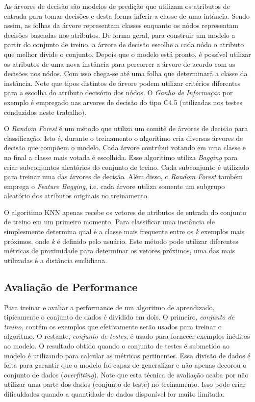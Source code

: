 As árvores de decisão são modelos de predição que utilizam os atributos de entrada para tomar decisões e desta forma inferir a classe de uma intância.
Sendo assim, as folhas da árvore representam classes enquanto os nódos representam decisões baseadas nos atributos.
De forma geral, para construir um modelo a partir do conjunto de treino, a árvore de decisão escolhe a cada nódo o atributo que melhor divide o conjunto.
Depois que o modelo está pronto, é possível utilizar os atributos de uma nova instância para percorrer a árvore de acordo com as decisões nos nódos.
Com isso chega-se até uma folha que determinará a classe da instância.
Note que tipos distintos de árvore podem utilizar critérios diferentes para a escolha do atributo decisório dos nódos.
O \textit{ Ganho de Informação} por exemplo é empregado nas arvores de decisão do tipo C4.5 (utilizadas nos testes conduzidos neste trabalho).

O \textit{Random Forest} é um método que utiliza um comitê de árvores de decisão para classificação.
Isto é, durante o treinamento o algoritimo cria diversas árvores de decisão que compõem o modelo.
Cada árvore contribui votando em uma classe e no final a classe mais votada é escolhida.
Esse algoritimo utiliza \textit{Bagging} para criar subconjuntos aleatórios do conjunto de treino.
Cada subconjunto é utilizado para treinar uma das árvores de decisão.
Além disso, o \textit{Random Forest} também emprega o \textit{Feature Bagging}, i.e. cada árvore utiliza somente um subgrupo aleatório dos atributos originais no treinamento.

O algoritimo KNN apenas recebe os vetores de atributos de entrada do conjunto de treino em um primeiro momento.
Para classificar uma instância ele simplesmente determina qual é a classe mais frequente entre os \textit{k} exemplos mais próximos, onde \textit{k} é definido pelo usuário.
Este método pode utilizar diferentes métricas de proximidade para determinar os vetores próximos, uma das mais utilizadas é a distância euclidiana.

\subsection{Avaliação de Performance}

Para treinar e avaliar a performance de um algoritmo de aprendizado, tipicamente o conjunto de dados é dividido em dois.
O primeiro, \textit{conjunto de treino}, contém os exemplos que efetivamente serão usados para treinar o algoritmo.
O restante, \textit{conjunto de testes}, é usado para fornecer exemplos inéditos ao modelo.
O resultado obtido quando o conjunto de testes é submetido ao modelo é utilizando para calcular as métricas pertinentes.
Essa divisão de dados é feita para garantir que o modelo foi capaz de generalizar e não apenas decorou o conjunto de dados (\textit{overfitting}).
Note que esta técnica de avaliação acaba por não utilizar uma parte dos dados (conjunto de teste) no treinamento.
Isso pode criar dificuldades quando a quantidade de dados disponível for muito limitada.

